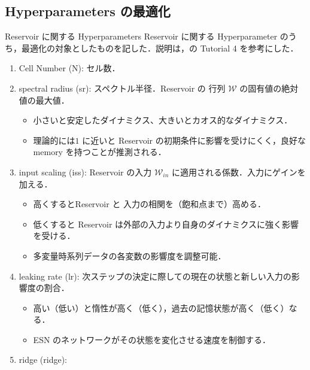 \subsection{Hyperparameters の最適化}
\begin{frame}{Reservoir に関する Hyperparameters}
    Reservoir に関する Hyperparameter のうち，最適化の対象としたものを記した．説明は，\cite{rpy_doc}の Tutorial 4 を参考にした．
    \begin{enumerate}
        \item Cell Number (N): セル数．
        \item spectral radius (sr): スペクトル半径．Reservoir の 行列 $\mathcal{W}$ の固有値の絶対値の最大値．\begin{itemize}
            \item 小さいと安定したダイナミクス、大きいとカオス的なダイナミクス．
            \item 理論的には$1$ に近いと Reservoir の初期条件に影響を受けにくく，良好な memory を持つことが推測される．
        \end{itemize}
        \item input scaling (iss): Reservoir の入力 $\mathcal{W}_{in}$ に適用される係数．入力にゲインを加える．\begin{itemize}
            \item 高くするとReservoir と 入力の相関を（飽和点まで）高める．
            \item 低くすると Reservoir は外部の入力より自身のダイナミクスに強く影響を受ける．
            \item 多変量時系列データの各変数の影響度を調整可能．
        \end{itemize}
        \item leaking rate (lr): 次ステップの決定に際しての現在の状態と新しい入力の影響度の割合．\begin{itemize}
            \item 高い（低い）と惰性が高く（低く），過去の記憶状態が高く（低く）なる．
            \item ESN のネットワークがその状態を変化させる速度を制御する．
        \end{itemize}
        \item ridge (ridge): 
    \end{enumerate}
\end{frame}

